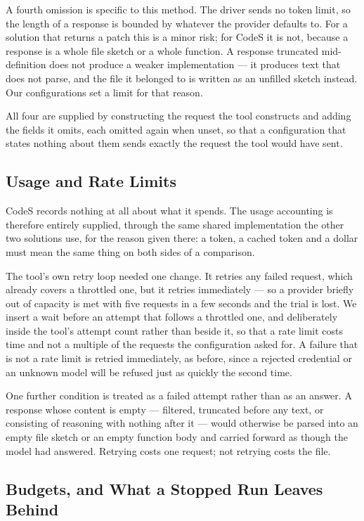 A fourth omission is specific to this method. The driver sends no token limit,
so the length of a response is bounded by whatever the provider defaults to.
For a solution that returns a patch this is a minor risk; for CodeS it is not,
because a response is a whole file sketch or a whole function. A response
truncated mid-definition does not produce a weaker implementation --- it
produces text that does not parse, and the file it belonged to is written as an
unfilled sketch instead. Our configurations set a limit for that reason.

All four are supplied by constructing the request the tool constructs and
adding the fields it omits, each omitted again when unset, so that a
configuration that states nothing about them sends exactly the request the tool
would have sent.

\subsection{Usage and Rate Limits}

CodeS records nothing at all about what it spends. The usage accounting is
therefore entirely supplied, through the same shared implementation the other
two solutions use, for the reason given there: a token, a cached token and a
dollar must mean the same thing on both sides of a comparison.

The tool's own retry loop needed one change. It retries any failed request,
which already covers a throttled one, but it retries immediately --- so a
provider briefly out of capacity is met with five requests in a few seconds and
the trial is lost. We insert a wait before an attempt that follows a throttled
one, and deliberately inside the tool's attempt count rather than beside it, so
that a rate limit costs time and not a multiple of the requests the
configuration asked for. A failure that is not a rate limit is retried
immediately, as before, since a rejected credential or an unknown model will be
refused just as quickly the second time.

One further condition is treated as a failed attempt rather than as an answer.
A response whose content is empty --- filtered, truncated before any text, or
consisting of reasoning with nothing after it --- would otherwise be parsed
into an empty file sketch or an empty function body and carried forward as
though the model had answered. Retrying costs one request; not retrying costs
the file.

\subsection{Budgets, and What a Stopped Run Leaves Behind}

